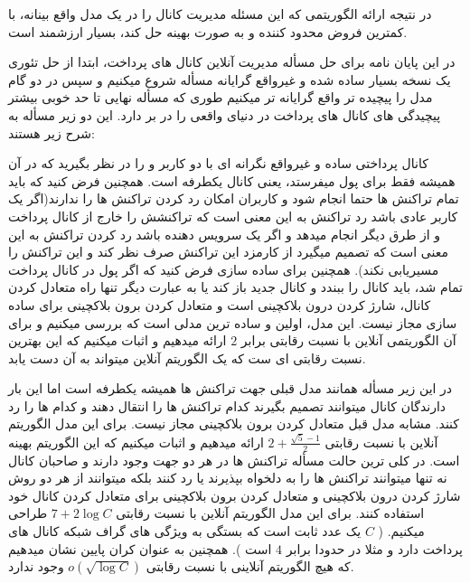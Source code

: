 در نتیجه ارائه الگوریتمی که این مسئله مدیریت کانال را در یک مدل واقع بینانه، با کمترین فروض محدود کننده و به صورت بهینه حل کند، بسیار ارزشمند است. 


در این پایان نامه برای حل مسأله مدیریت آنلاین کانال های پرداخت، ابتدا از حل تئوری یک نسخه بسیار ساده شده و غیرواقع گرایانه مسأله شروع میکنیم و سپس در دو گام مدل را پیچیده تر واقع گرایانه تر میکنیم طوری که مسأله نهایی تا حد خوبی بیشتر پیچیدگی های کانال های پرداخت در دنیای واقعی را در بر دارد. این دو زیر مسأله به شرح زیر هستند:

 کانال پرداختی ساده و غیرواقع نگرانه ای با دو کاربر  و  را در نظر بگیرید که در آن همیشه فقط  برای  پول میفرستد، یعنی کانال یکطرفه است. همچنین فرض کنید که باید تمام تراکنش ها حتما انجام شود و کاربران امکان رد کردن تراکنش ها را ندارند(اگر  یک کاربر عادی باشد رد تراکنش به این معنی است که  تراکنشش را خارج از کانال پرداخت و از طرق دیگر انجام میدهد و اگر  یک سرویس دهنده باشد رد کردن تراکنش به این معنی است که  تصمیم میگیرد از کارمزد این تراکنش صرف نظر کند و این تراکنش را مسیریابی نکند). همچنین برای ساده سازی فرض کنید که اگر پول  در کانال پرداخت تمام شد، باید کانال را ببندد و کانال جدید باز کند یا به عبارت دیگر تنها راه متعادل کردن کانال، شارژ کردن درون بلاکچینی است و متعادل کردن برون بلاکچینی برای ساده سازی مجاز نیست. این مدل، اولین و ساده ترین مدلی است که بررسی میکنیم و برای آن الگوریتمی آنلاین با نسبت رقابتی برابر $2$ ارائه میدهیم و اثبات میکنیم که این بهترین نسبت رقابتی ای ست که یک الگوریتم آنلاین میتواند به آن دست یابد.

در این زیر مسأله همانند مدل قبلی جهت تراکنش ها همیشه یکطرفه است اما این بار دارندگان کانال میتوانند تصمیم بگیرند کدام تراکنش ها را انتقال دهند و کدام ها را رد کنند. مشابه مدل قبل
متعادل کردن برون بلاکچینی مجاز نیست. برای این مدل الگوریتم آنلاین با نسبت رقابتی
$2+\frac{\sqrt{5}-1}{2}$  
ارائه میدهیم و اثبات میکنیم که این الگوریتم بهینه است.
در کلی ترین حالت مسأله تراکنش ها در هر دو جهت وجود دارند و صاحبان کانال نه تنها میتوانند تراکنش ها را به دلخواه بپذیرند یا رد کنند بلکه میتوانند از هر دو روش شارژ کردن درون بلاکچینی و متعادل کردن برون بلاکچینی برای متعادل کردن کانال خود استفاده کنند. برای این مدل الگوریتم آنلاین با نسبت رقابتی
 $7+2\log{C}$
طراحی میکنیم.
(
$C$
یک عدد ثابت است که بستگی به ویژگی های گراف شبکه کانال های پرداخت دارد و مثلا در  حدودا برابر $4$ است
). 
همچنین به عنوان کران پایین نشان میدهیم که هیچ الگوریتم آنلاینی با  نسبت رقابتی 
$o(\sqrt{\log{C}})$
 وجود ندارد.

